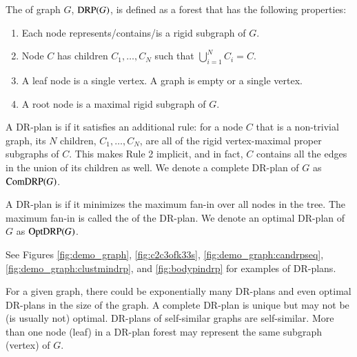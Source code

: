 \begin{definition}\label{def:drp}
    The  \cite{hoffman2001decompositionI} of graph $G$, $\text{DRP}(G)$, is defined as a forest that has the following properties:
    \begin{enumerate}
        \item Each node represents/contains/is a rigid subgraph of $G$.
        \item Node $C$ has children $C_1,\ldots,C_N$ such that $\bigcup_{i=1}^N{C_i}=C$.
        \item A leaf node is a single vertex. A  graph is empty or a single vertex.
        \item A root node is a maximal rigid subgraph of $G$.
    \end{enumerate}
%
%
    A DR-plan is  if it satisfies an additional rule: for a node $C$ that is  a non-trivial graph, its $N$ children, $C_1, \ldots, C_N$, are all of the rigid vertex-maximal proper subgraphs of $C$. This makes Rule 2 implicit, and in fact, $C$ contains all the edges in the union of its children as well. We denote a complete DR-plan of $G$ as $\text{ComDRP}(G)$.

    A DR-plan is  if it minimizes the maximum fan-in over all nodes in the tree. The maximum  fan-in is called the  of the DR-plan. We denote an optimal DR-plan of $G$ as $\text{OptDRP}(G)$.

    See Figures \ref{fig:demo_graph}, \ref{fig:c2c3ofk33s}, \ref{fig:demo_graph:candrpseq}, \ref{fig:demo_graph:clustmindrp}, and \ref{fig:bodypindrp} for examples of DR-plans.

%
\end{definition}
%
\begin{remark}
    For a given graph, there could be exponentially many  DR-plans and even optimal DR-plans in the size of the graph. A complete DR-plan is unique but may not be (is usually not) optimal. DR-plans of self-similar graphs are self-similar. More than one node (leaf) in a DR-plan forest may represent the same subgraph (vertex) of $G$.
\end{remark}


